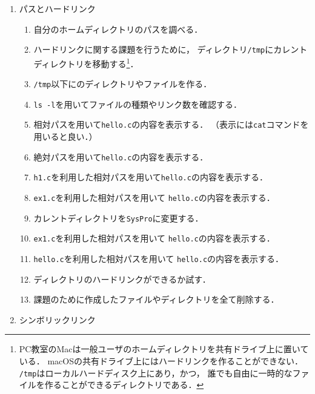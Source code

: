 \begin{enumerate}
\item パスとハードリンク
\begin{enumerate}
\item 自分のホームディレクトリのパスを調べる．
\item ハードリンクに関する課題を行うために，
ディレクトリ\texttt{/tmp}にカレントディレクトリを移動する\footnote{
PC教室のMacは一般ユーザのホームディレクトリを共有ドライブ上に置いている．
macOSの共有ドライブ上にはハードリンクを作ることができない．
\texttt{/tmp}はローカルハードディスク上にあり，かつ，
誰でも自由に一時的なファイルを作ることができるディレクトリである．}．
\item \texttt{/tmp}以下にのディレクトリやファイルを作る．
\item \texttt{ls -l}を用いてファイルの種類やリンク数を確認する．
\item 相対パスを用いて\texttt{hello.c}の内容を表示する．
（表示には\texttt{cat}コマンドを用いると良い．）
\item 絶対パスを用いて\texttt{hello.c}の内容を表示する．
\item \texttt{h1.c}を利用した相対パスを用いて\texttt{hello.c}の内容を表示する．
\item \texttt{ex1.c}を利用した相対パスを用いて
\texttt{hello.c}の内容を表示する．
\item カレントディレクトリを\texttt{SysPro}に変更する．
\item \texttt{ex1.c}を利用した相対パスを用いて
\texttt{hello.c}の内容を表示する．
\item \texttt{hello.c}を利用した相対パスを用いて
\texttt{hello.c}の内容を表示する．
\item ディレクトリのハードリンクができるか試す．
\item 課題のために作成したファイルやディレクトリを全て削除する．
\end{enumerate}

\item シンボリックリンク


\end{enumerate}
